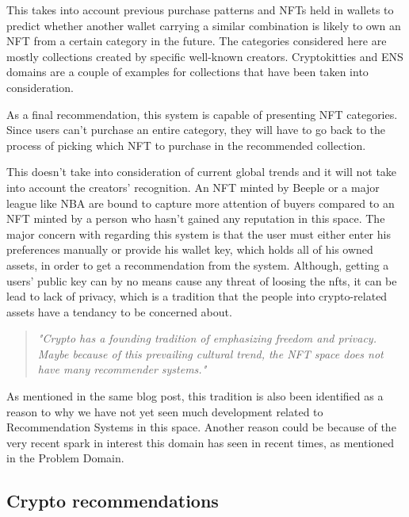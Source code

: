 This takes into account previous purchase patterns and NFTs held in wallets to predict whether another wallet carrying a similar combination is likely to own an NFT from a certain category in the future. The categories considered here are mostly collections created by specific well-known creators. Cryptokitties and ENS domains are a couple of examples for collections that have been taken into consideration.

As a final recommendation, this system is capable of presenting NFT categories. Since users can't purchase an entire category, they will have to go back to the process of picking which NFT to purchase in the recommended collection.

This doesn't take into consideration of current global trends and it will not take into account the creators' recognition. An NFT minted by Beeple or a major league like NBA are bound to capture more attention of buyers compared to an NFT minted by a person who hasn't gained any reputation in this space. The major concern with regarding this system is that the user must either enter his preferences manually or provide his wallet key, which holds all of his owned assets, in order to get a recommendation from the system. Although, getting a users' public key can by no means cause any threat of loosing the \gls{nft}s, it can be lead to lack of privacy, which is a tradition that the people into crypto-related assets have a tendancy to be concerned about.


\begin{quote} 
\centering 
\emph{"Crypto has a founding tradition of emphasizing freedom and privacy. Maybe because of this prevailing cultural trend, the NFT space does not have many recommender systems."} 
\\
\raggedleft
\autocite{noauthor_what_2020}
\end{quote}

As mentioned in the same blog post, this tradition is also been identified as a reason to why we have not yet seen much development related to Recommendation Systems in this space. Another reason could be because of the very recent spark in interest this domain has seen in recent times, as mentioned in the Problem Domain.




\subsection{Crypto recommendations}


